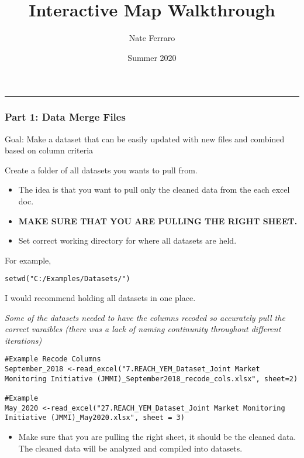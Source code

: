 \documentclass[
]{article}
\title{Interactive Map Walkthrough}
\author{Nate Ferraro}
\date{Summer 2020}
\providecommand{\tightlist}{%
  \setlength{\itemsep}{0pt}\setlength{\parskip}{0pt}}
\begin{document}
\maketitle

\begin{center}\rule{0.5\linewidth}{0.5pt}\end{center}

\hypertarget{part-1-data-merge-files}{%
\subsubsection{Part 1: Data Merge Files}\label{part-1-data-merge-files}}

Goal: Make a dataset that can be easily updated with new files and
combined based on column criteria

Create a folder of all datasets you wants to pull from.

\begin{itemize}
\tightlist
\item
  The idea is that you want to pull only the cleaned data from the each
  excel doc.
\item
  \textbf{MAKE SURE THAT YOU ARE PULLING THE RIGHT SHEET.}
\item
  Set correct working directory for where all datasets are held.
\end{itemize}

For example,

\begin{verbatim}
setwd("C:/Examples/Datasets/")
\end{verbatim}

I would recommend holding all datasets in one place.

\emph{Some of the datasets needed to have the columns recoded so
accurately pull the correct varaibles (there was a lack of naming
continunity throughout different iterations)}

\begin{verbatim}
#Example Recode Columns
September_2018 <-read_excel("7.REACH_YEM_Dataset_Joint Market Monitoring Initiative (JMMI)_September2018_recode_cols.xlsx", sheet=2)

#Example
May_2020 <-read_excel("27.REACH_YEM_Dataset_Joint Market Monitoring Initiative (JMMI)_May2020.xlsx", sheet = 3)
\end{verbatim}

\begin{itemize}
\tightlist
\item
  Make sure that you are pulling the right sheet, it should be the
  cleaned data. The cleaned data will be analyzed and compiled into
  datasets.
\end{itemize}
\end{document}
